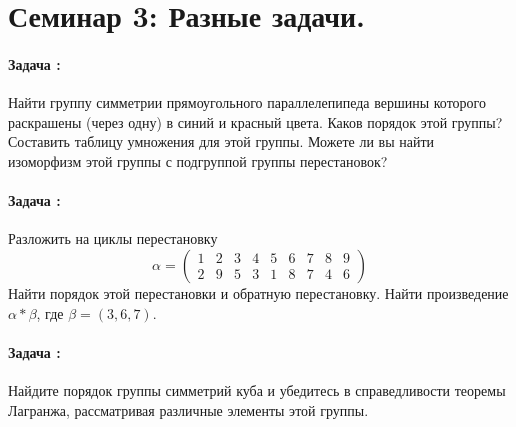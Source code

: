 \documentclass[amsmath,amssymb,12pt]{revtex4}
\newif\ifimportant
\newcommand{\1}{\frac{1}{2}}
\begin{document}
\newpage
\section*{\large Семинар 3: Разные задачи.}
\setcounter{prn}{0}

\addtocounter{prn}{1}
\vspace{0.3cm}
\paragraph*{Задача \theprn: }
%

Найти группу симметрии прямоугольного параллелепипеда вершины которого раскрашены (через одну) в синий и красный цвета. Каков порядок этой группы? Составить таблицу умножения для этой группы. Можете ли вы найти изоморфизм этой группы с подгруппой группы перестановок?



\addtocounter{prn}{1}
\vspace{0.3cm}
\paragraph*{Задача \theprn: }
%

Разложить на циклы перестановку
$$
	\alpha = \left(
	\begin{array}{ccccccccc}
		1 &  2 & 3 & 4 & 5 & 6 & 7 & 8 & 9 \\
		2 & 9 & 5 & 3 & 1 & 8 & 7 & 4 & 6 
	\end{array}
	\right)
$$
Найти порядок этой  перестановки и обратную перестановку. Найти произведение $\alpha * \beta$, где $\beta = (3,6,7)$.






\addtocounter{prn}{1}
\vspace{0.3cm}
\paragraph*{Задача \theprn: }

Найдите порядок группы симметрий куба и убедитесь в справедливости теоремы Лагранжа, рассматривая различные элементы этой группы.
\end{document}
